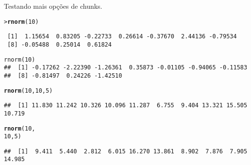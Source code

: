 \documentclass{article}\usepackage[]{graphicx}\usepackage[]{color}
\makeatletter
\newcommand{\hlnum}[1]{\textcolor[rgb]{0.686,0.059,0.569}{#1}}%
\newcommand{\hlstd}[1]{\textcolor[rgb]{0.345,0.345,0.345}{#1}}%
\newcommand{\hlkwd}[1]{\textcolor[rgb]{0.737,0.353,0.396}{\textbf{#1}}}%
\newenvironment{kframe}{%
 \def\at@end@of@kframe{}%
 \ifinner\ifhmode%
  \def\at@end@of@kframe{\end{minipage}}%
  \begin{minipage}{\columnwidth}%
 \fi\fi%
 \def\FrameCommand##1{\hskip\@totalleftmargin \hskip-\fboxsep
 \colorbox{shadecolor}{##1}\hskip-\fboxsep
     \hskip-\linewidth \hskip-\@totalleftmargin \hskip\columnwidth}%
 \MakeFramed {\advance\hsize-\width
   \@totalleftmargin\z@ \linewidth\hsize
   \@setminipage}}%
 {\par\unskip\endMakeFramed%
 \at@end@of@kframe}
\newenvironment{knitrout}{}{} %
\makeatother
\begin{document}
\newpage

Testando mais opções de chunks.

\begin{knitrout}
\color{fgcolor}\begin{kframe}
\begin{alltt}
\hlstd{> }\hlkwd{rnorm}\hlstd{(}\hlnum{10}\hlstd{)}
\end{alltt}
\begin{verbatim}
 [1]  1.15654  0.83205 -0.22733  0.26614 -0.37670  2.44136 -0.79534
 [8] -0.05488  0.25014  0.61824
\end{verbatim}
\end{kframe}
\end{knitrout}


\begin{knitrout}\large
{}\color{fgcolor}\begin{kframe}
\begin{verbatim}
rnorm(10)
##  [1] -0.17262 -2.22390 -1.26361  0.35873 -0.01105 -0.94065 -0.11583
##  [8] -0.81497  0.24226 -1.42510
\end{verbatim}
\end{kframe}
\end{knitrout}


\begin{knitrout}
\color{fgcolor}\begin{kframe}
\begin{alltt}
\hlkwd{rnorm}\hlstd{(}\hlnum{10}\hlstd{,} \hlnum{10}\hlstd{,} \hlnum{5}\hlstd{)}
\end{alltt}
\begin{verbatim}
##  [1] 11.830 11.242 10.326 10.096 11.287  6.755  9.404 13.321 15.505 10.719
\end{verbatim}
\end{kframe}
\end{knitrout}


\begin{knitrout}
\color{fgcolor}\begin{kframe}
\begin{alltt}
\hlkwd{rnorm}\hlstd{(}\hlnum{10}\hlstd{,}
      \hlnum{10}\hlstd{,} \hlnum{5}\hlstd{)}
\end{alltt}
\begin{verbatim}
##  [1]  9.411  5.440  2.812  6.015 16.270 13.861  8.902  7.876  7.905 14.985
\end{verbatim}
\end{kframe}
\end{knitrout}
\end{document}
